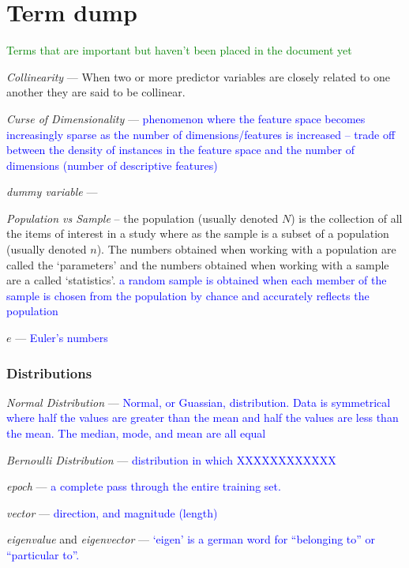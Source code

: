 \chapter{Term dump}

\textcolor{green}{Terms that are important but haven't been placed in the document yet}

\emph{Collinearity} --- When two or more predictor variables are closely related to one another they are said to be collinear.

\emph{Curse of Dimensionality} --- \textcolor{blue}{phenomenon where the feature space becomes increasingly sparse as the number of dimensions/features is increased -- trade off between the density of instances in the feature space and the number of dimensions (number of descriptive features)}

\emph{dummy variable} ---


\emph{Population vs Sample} -- the population (usually denoted $N$) is the collection of all the items of interest in a study where as the sample is a subset of a population (usually denoted $n$). The numbers obtained when working with a population are called the `parameters' and the numbers obtained when working with a sample are a called `statistics'. \textcolor{blue}{a random sample is obtained when each member of the sample is chosen from the population by chance and accurately reflects the population}

\emph{$e$} --- \textcolor{blue}{Euler's numbers}

\subsection{Distributions}

\emph{Normal Distribution} --- \textcolor{blue}{Normal, or Guassian, distribution. Data is symmetrical where half the values are greater than the mean and half the values are less than the mean. The median, mode, and mean are all equal}

\emph{Bernoulli Distribution} --- \textcolor{blue}{distribution in which XXXXXXXXXXXX}

\emph{epoch} --- \textcolor{blue}{a complete pass through the entire training set.}

\emph{vector} --- \textcolor{blue}{direction, and magnitude (length)}

\emph{eigenvalue} and \emph{eigenvector} --- \textcolor{blue}{`eigen' is a german word for ``belonging to'' or ``particular to''.} 